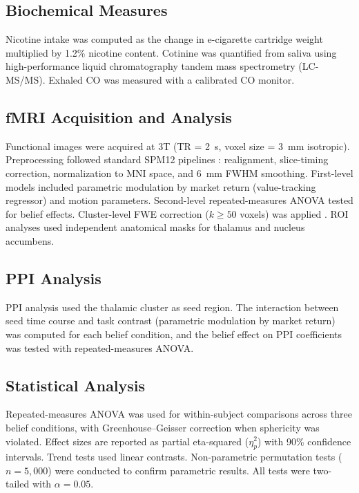 \documentclass[11pt]{article}
\begin{document}
\subsection{Biochemical Measures}

Nicotine intake was computed as the change in e-cigarette cartridge weight multiplied by 1.2\% nicotine content. Cotinine was quantified from saliva using high-performance liquid chromatography tandem mass spectrometry (LC-MS/MS). Exhaled CO was measured with a calibrated CO monitor.

\subsection{fMRI Acquisition and Analysis}

Functional images were acquired at 3T (TR = 2~s, voxel size = 3~mm isotropic). Preprocessing followed standard SPM12 pipelines \citep{woolrich2009}: realignment, slice-timing correction, normalization to MNI space, and 6~mm FWHM smoothing. First-level models included parametric modulation by market return (value-tracking regressor) and motion parameters. Second-level repeated-measures ANOVA tested for belief effects. Cluster-level FWE correction ($k \geq 50$ voxels) was applied \citep{winkler2014}. ROI analyses used independent anatomical masks for thalamus and nucleus accumbens.

\subsection{PPI Analysis}

PPI analysis \citep{friston1997} used the thalamic cluster as seed region. The interaction between seed time course and task contrast (parametric modulation by market return) was computed for each belief condition, and the belief effect on PPI coefficients was tested with repeated-measures ANOVA.

\subsection{Statistical Analysis}

Repeated-measures ANOVA was used for within-subject comparisons across three belief conditions, with Greenhouse--Geisser correction when sphericity was violated. Effect sizes are reported as partial eta-squared ($\eta_p^2$) with 90\% confidence intervals. Trend tests used linear contrasts. Non-parametric permutation tests ($n = 5{,}000$) were conducted to confirm parametric results. All tests were two-tailed with $\alpha = 0.05$.
\end{document}
